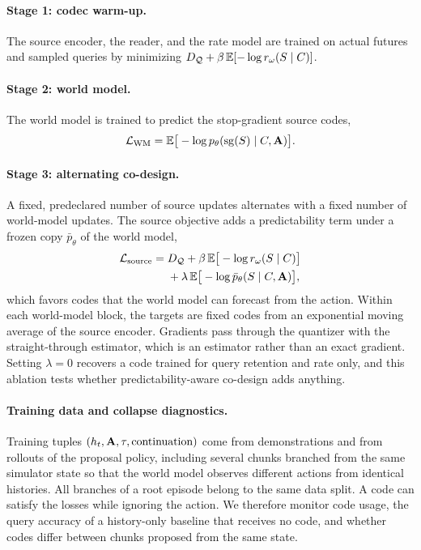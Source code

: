 \paragraph{Stage 1: codec warm-up.}
The source encoder, the reader, and the rate model are trained on actual futures and sampled queries by minimizing $D_{\mathcal{Q}}+\beta\,\mathbb{E}[-\log r_\omega(S\mid C)]$.

\paragraph{Stage 2: world model.}
The world model is trained to predict the stop-gradient source codes,
\begin{equation}
  \mathcal{L}_{\mathrm{WM}}=\mathbb{E}\big[-\log p_\theta(\operatorname{sg}(S)\mid C,\mathbf{A})\big].
  \label{eq:wm}
\end{equation}

\paragraph{Stage 3: alternating co-design.}
A fixed, predeclared number of source updates alternates with a fixed number of world-model updates.
The source objective adds a predictability term under a frozen copy $\bar p_\theta$ of the world model,
\begin{equation}
\begin{aligned}
  \mathcal{L}_{\mathrm{source}}={}&D_{\mathcal{Q}}+\beta\,\mathbb{E}\big[-\log r_\omega(S\mid C)\big]\\
  &+\lambda\,\mathbb{E}\big[-\log \bar p_\theta(S\mid C,\mathbf{A})\big],
\end{aligned}
  \label{eq:source}
\end{equation}
which favors codes that the world model can forecast from the action.
Within each world-model block, the targets are fixed codes from an exponential moving average of the source encoder.
Gradients pass through the quantizer with the straight-through estimator, which is an estimator rather than an exact gradient.
Setting $\lambda{=}0$ recovers a code trained for query retention and rate only, and this ablation tests whether predictability-aware co-design adds anything.

\paragraph{Training data and collapse diagnostics.}
Training tuples $(h_t,\mathbf{A},\tau,\text{continuation})$ come from demonstrations and from rollouts of the proposal policy, including several chunks branched from the same simulator state so that the world model observes different actions from identical histories.
All branches of a root episode belong to the same data split.
A code can satisfy the losses while ignoring the action.
We therefore monitor code usage, the query accuracy of a history-only baseline that receives no code, and whether codes differ between chunks proposed from the same state.

